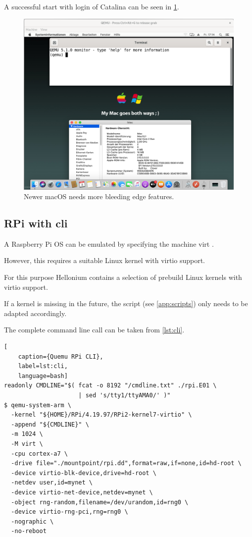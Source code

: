 \noindent A successful start with login of Catalina can be seen in \cref{fig:locations}.

\begin{figure}[htbp]  %
  \centering
  \includegraphics[width=.75\textwidth]{figures/boot-macos-catalina.png}
  \caption[Qemu macOS location]{Newer macOS needs more bleeding edge features.}
  \label{fig:locations}
\end{figure}

\subsection{RPi with cli}

A Raspberry Pi OS can be emulated by specifying the machine \glqq{}virt\grqq{} \cite{QemuARM}.

However, this requires a suitable Linux kernel with virtio support.

For this purpose Hellonium contains a selection of prebuild Linux kernels with virtio support.

If a kernel is missing in the future, the script (see \cref{app:scripts}) only needs to be adapted accordingly.

The complete command line call can be taken from \cref{lst:cli}.

\begin{lstlisting}[
    caption={Quemu RPi CLI},
    label=lst:cli,
    language=bash]
readonly CMDLINE="$( fcat -o 8192 "/cmdline.txt" ./rpi.E01 \
                     | sed 's/tty1/ttyAMA0/' )"
$ qemu-system-arm \
  -kernel "${HOME}/RPi/4.19.97/RPi2-kernel7-virtio" \
  -append "${CMDLINE}" \
  -m 1024 \
  -M virt \
  -cpu cortex-a7 \
  -drive file="./mountpoint/rpi.dd",format=raw,if=none,id=hd-root \
  -device virtio-blk-device,drive=hd-root \
  -netdev user,id=mynet \
  -device virtio-net-device,netdev=mynet \
  -object rng-random,filename=/dev/urandom,id=rng0 \
  -device virtio-rng-pci,rng=rng0 \
  -nographic \
  -no-reboot
\end{lstlisting}

